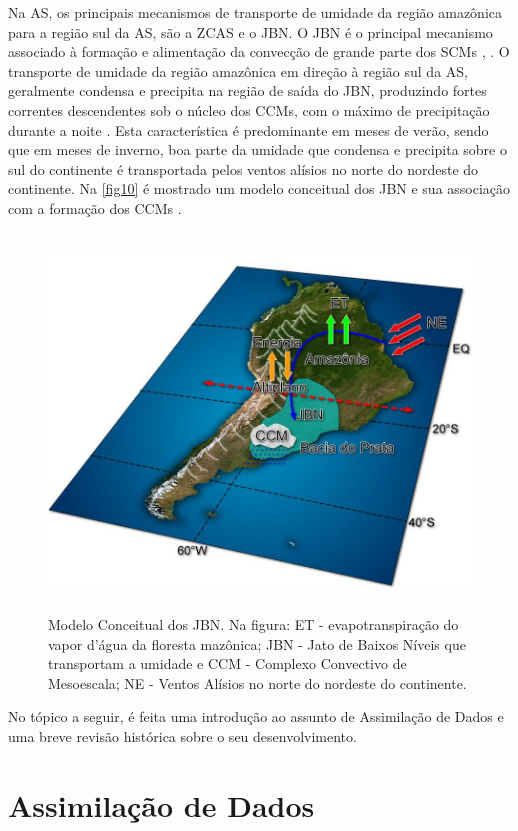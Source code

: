 Na AS, os principais mecanismos de transporte de umidade da região amazônica para a região sul da AS, são a ZCAS e o JBN. O JBN é o principal mecanismo associado à formação e alimentação da convecção de grande parte dos SCMs \cite{ferreiraetal03}, \cite{herdiesetal02}. O transporte de umidade da região amazônica em direção à região sul da AS, geralmente condensa e precipita na região de saída do JBN, produzindo fortes correntes descendentes sob o núcleo dos CCMs, com o máximo de precipitação durante a noite \cite{noguespaegleberbery00}. Esta característica é predominante em meses de verão, sendo que em meses de inverno, boa parte da umidade que condensa e precipita sobre o sul do continente é transportada pelos ventos alísios no norte do nordeste do continente. Na \autoref{fig10} é mostrado um modelo conceitual dos JBN e sua associação com a formação dos CCMs \cite{marengoetal04}.

\begin{figure}[!hbp]
\includegraphics[height=10cm]{./figs/fig10.png}
\caption{Modelo Conceitual dos JBN. Na figura: ET - evapotranspiração do vapor d'água da floresta mazônica; JBN - Jato de Baixos Níveis que transportam a umidade e CCM - Complexo Convectivo de Mesoescala; NE - Ventos Alísios no norte do nordeste do continente.}
\label{fig10}
\end{figure}

No tópico a seguir, é feita uma introdução ao assunto de Assimilação de Dados e uma breve revisão histórica sobre o seu desenvolvimento.

\section{Assimilação de Dados}
\label{ss:assimdados}

